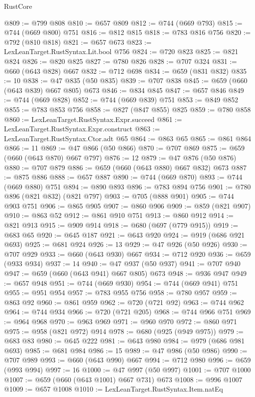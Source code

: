 \begin{lexlean}{RustCore}
\begin{coremodule}
@809 := @799 @808
@810 := @657 @809
@812 := @744 (@669 @793)
@815 := @744 (@669 @800) @751
@816 := @812 @815
@818 := @783 @816 @756
@820 := @792 (@810 @818)
@821 := @657 @673
@823 := LexLeanTarget.RustSyntax.Lit.bool @756
@824 := @720 @823
@825 := @821 @824
@826 := @820 @825
@827 := @780 @826
@828 := @707 @324
@831 := @660 (@643 @828) @667
@832 := @712 @698
@834 := @659 (@831 @832)
@835 := 10
@838 := @47 @835 (@50 @835)
@839 := @707 @838
@845 := @659 (@660 (@643 @839) @667 @805) @673
@846 := @834 @845
@847 := @657 @846
@849 := @744 (@669 @828)
@852 := @744 (@669 @839) @751
@853 := @849 @852
@855 := @783 @853 @756
@858 := @827 (@847 @855) @825
@859 := @780 @858
@860 := LexLeanTarget.RustSyntax.Expr.succeed
@861 := LexLeanTarget.RustSyntax.Expr.construct
@863 := LexLeanTarget.RustSyntax.Ctor.adt @65
@864 := @863 @65
@865 := @861 @864
@866 := 11
@869 := @47 @866 (@50 @866)
@870 := @707 @869
@875 := @659 (@660 (@643 @870) @667 @797)
@876 := 12
@879 := @47 @876 (@50 @876)
@880 := @707 @879
@886 := @659 (@660 (@643 @880) @667 @832) @673
@887 := @875 @886
@888 := @657 @887
@890 := @744 (@669 @870)
@893 := @744 (@669 @880) @751
@894 := @890 @893
@896 := @783 @894 @756
@901 := @780 @896 (@821 @832) (@821 @797)
@903 := @705 (@888 @901)
@905 := @744 @903 @751
@906 := @865 @905
@907 := @860 @906
@909 := @859 (@821 @907)
@910 := @863 @52
@912 := @861 @910 @751
@913 := @860 @912
@914 := @821 @913
@915 := @909 @914
@918 := @680 (@697 (@779 @915))
@919 := @683 @65
@920 := @645 @187
@921 := @643 @920
@924 := @919 (@686 @921 @693)
@925 := @681 @924
@926 := 13
@929 := @47 @926 (@50 @926)
@930 := @707 @929
@933 := @660 (@643 @930) @667
@934 := @712 @920
@936 := @659 (@933 @934)
@937 := 14
@940 := @47 @937 (@50 @937)
@941 := @707 @940
@947 := @659 (@660 (@643 @941) @667 @805) @673
@948 := @936 @947
@949 := @657 @948
@951 := @744 (@669 @930)
@954 := @744 (@669 @941) @751
@955 := @951 @954
@957 := @783 @955 @756
@958 := @780 @957
@959 := @863 @92
@960 := @861 @959
@962 := @720 (@721 @92)
@963 := @744 @962
@964 := @744 @934
@966 := @720 (@721 @205)
@968 := @744 @966 @751
@969 := @964 @968
@970 := @963 @969
@971 := @960 @970
@972 := @860 @971
@975 := @958 (@821 @972) @914
@978 := @680 (@925 (@949 @975))
@979 := @683 @83
@980 := @645 @222
@981 := @643 @980
@984 := @979 (@686 @981 @693)
@985 := @681 @984
@986 := 15
@989 := @47 @986 (@50 @986)
@990 := @707 @989
@993 := @660 (@643 @990) @667
@994 := @712 @980
@996 := @659 (@993 @994)
@997 := 16
@1000 := @47 @997 (@50 @997)
@1001 := @707 @1000
@1007 := @659 (@660 (@643 @1001) @667 @731) @673
@1008 := @996 @1007
@1009 := @657 @1008
@1010 := LexLeanTarget.RustSyntax.Item.natEq

\end{coremodule}
\end{lexlean}
